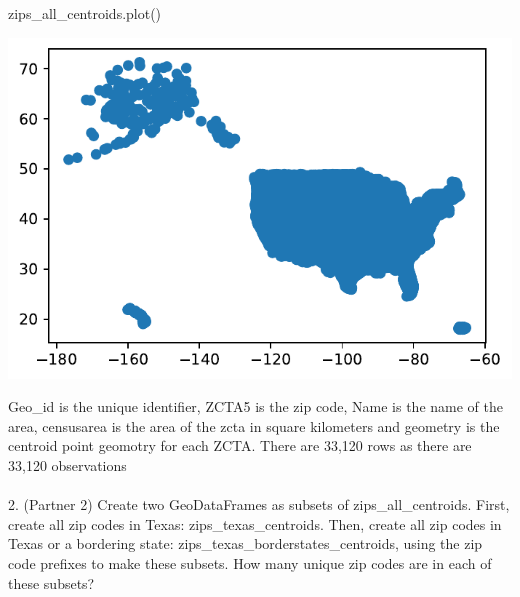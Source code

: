 \documentclass[
  letterpaper,
  DIV=11,
  numbers=noendperiod]{scrartcl}
\makeatletter
\let\oldparagraph\paragraph
\renewcommand{\paragraph}{
    \@ifstar
      \xxxParagraphStar
      \xxxParagraphNoStar
  }
\newcommand{\xxxParagraphStar}[1]{\oldparagraph*{#1}\mbox{}}
\newcommand{\xxxParagraphNoStar}[1]{\oldparagraph{#1}\mbox{}}
\newenvironment{Shaded}{\begin{snugshade}}{\end{snugshade}}
\newcommand{\NormalTok}[1]{\textcolor[rgb]{0.00,0.23,0.31}{#1}}
\makeatother
\begin{document}
\begin{Shaded}
\begin{Highlighting}[]
\NormalTok{zips\_all\_centroids.plot()}
\end{Highlighting}
\end{Shaded}

\includegraphics{ps4_files/figure-pdf/cell-20-output-1.pdf}

Geo\_id is the unique identifier, ZCTA5 is the zip code, Name is the
name of the area, censusarea is the area of the zcta in square
kilometers and geometry is the centroid point geomotry for each ZCTA.
There are 33,120 rows as there are 33,120 observations

\paragraph{2. (Partner 2) Create two GeoDataFrames as subsets of
zips\_all\_centroids. First, create all zip codes in Texas:
zips\_texas\_centroids. Then, create all zip codes in Texas or a
bordering state: zips\_texas\_borderstates\_centroids, using the zip
code prefixes to make these subsets. How many unique zip codes are in
each of these
subsets?}\label{partner-2-create-two-geodataframes-as-subsets-of-zips_all_centroids.-first-create-all-zip-codes-in-texas-zips_texas_centroids.-then-create-all-zip-codes-in-texas-or-a-bordering-state-zips_texas_borderstates_centroids-using-the-zip-code-prefixes-to-make-these-subsets.-how-many-unique-zip-codes-are-in-each-of-these-subsets}
\end{document}

